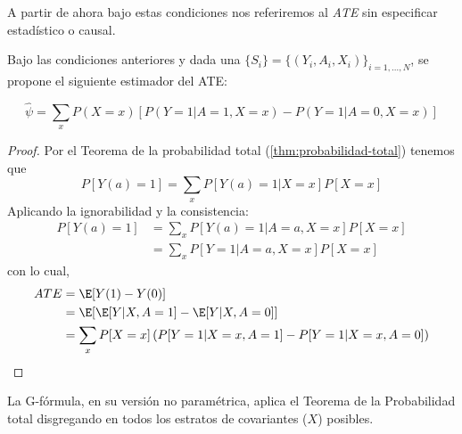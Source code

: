 \begin{nota}
	A partir de ahora bajo estas condiciones nos referiremos al \textit{ATE} sin especificar estadístico o causal.
\end{nota}

\begin{proposicion}
	Bajo las condiciones anteriores y dada una \MAS $\{S_i\} = \{(Y_i, A_i, X_i)\}_{i = 1, ..., N}$, se propone el siguiente estimador del ATE:

	$$
		\hat\psi = \sum_x P(X = x) \left[P(Y = 1 | A = 1, X = x) - P(Y = 1 | A = 0, X = x) \right]
	$$
\end{proposicion}

\begin{proof}\cite[material suplementario S1]{luque2021}
	Por el Teorema de la probabilidad total (\ref{thm:probabilidad-total}) tenemos que
	$$
		P[Y(a) = 1 ] = \sum_x P[Y(a) = 1 | X = x]P[X = x]
	$$
	Aplicando la ignorabilidad y la consistencia: %
	\begin{align*}
		P[Y(a) = 1] & = \sum_x P[Y(a) = 1 | A = a, X = x]P[X = x] \\
		            & = \sum_x P[Y = 1 | A = a, X = x]P[X = x]
	\end{align*}
	con lo cual,
	\begin{align*}
		ATE & = \E[Y(1) - Y(0)]                                                                \\
		    & = \E[\E[Y | X, A = 1] - \E[Y | X, A = 0]]                                        \\
		    & = \sum_x P[X = x] \left(P[Y = 1 | X = x, A = 1] - P[Y = 1 | X = x, A = 0]\right)
	\end{align*}

\end{proof}

\begin{observacion}
	La G-fórmula, en su versión no paramétrica, aplica el Teorema de la Probabilidad total
	disgregando en todos los estratos de covariantes ($X$) posibles.
\end{observacion}



